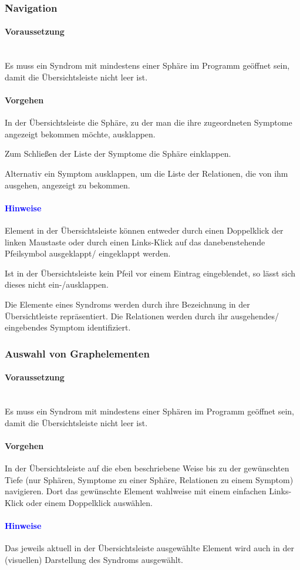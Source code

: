 \documentclass[enabledeprecatedfontcommands,fontsize=11pt,paper=a4,twoside]{scrartcl}
\newcounter{one}
\newcounter{two}[one]
\newcommand*{\hint}{\paragraph{\textcolor{blue}{Hinweise}}}
\newcommand*{\condition}{\paragraph{Voraussetzung}$\;$ \vspace{0.2cm}\\}
\newcommand*{\action}{\paragraph{Vorgehen}}
\let\tempone\itemize
\let\temptwo\enditemize
\renewenvironment{itemize}{\tempone\addtolength{\itemsep}{-10.0pt}}{\temptwo}
\let\origenumerate\enumerate
\let\origendenumerate\endenumerate
\renewenvironment{enumerate}{\origenumerate \addtolength{\itemsep}{-10.0pt}}{\origendenumerate}
\begin{document}
\subsubsection{Navigation}		
	\condition
	Es muss ein Syndrom mit mindestens einer Sphäre im Programm geöffnet sein, damit die Übersichtsleiste nicht leer ist. 
	\action
	\begin{enumerate}
		\item In der Übersichtsleiste die Sphäre, zu der man die ihre zugeordneten Symptome angezeigt bekommen möchte, ausklappen. 
		\item Zum Schließen der Liste der Symptome die Sphäre einklappen. 
		\item Alternativ ein Symptom ausklappen, um die Liste der Relationen, die von ihm ausgehen, angezeigt zu bekommen. 
	\end{enumerate}
	\hint
	\begin{itemize}
		\item Element in der Übersichtsleiste können entweder durch einen Doppelklick der linken Maustaste oder durch einen Links-Klick auf das danebenstehende Pfeilsymbol ausgeklappt/ eingeklappt werden. 
		\item Ist in der Übersichtsleiste kein Pfeil vor einem Eintrag eingeblendet, so lässt sich dieses nicht ein-/ausklappen.
		\item Die Elemente eines Syndroms werden durch ihre Bezeichnung in der Übersichtleiste repräsentiert. Die Relationen werden durch ihr ausgehendes/ eingebendes Symptom identifiziert.\\
	\end{itemize}
		 
\subsubsection{Auswahl von Graphelementen}		
	\condition
	Es muss ein Syndrom mit mindestens einer Sphären im Programm geöffnet sein, damit die Übersichtsleiste nicht leer ist. 
	\action
	\begin{enumerate}
		\item In der Übersichtsleiste auf die eben beschriebene Weise bis zu der gewünschten Tiefe (nur Sphären, Symptome zu einer Sphäre, Relationen zu einem Symptom) navigieren. Dort das gewünschte Element wahlweise mit einem einfachen Links-Klick oder einem Doppelklick auswählen.
		\end{enumerate}
	\hint
	\begin{itemize}
		\item Das jeweils aktuell in der Übersichtsleiste ausgewählte Element wird auch in der (visuellen) Darstellung des Syndroms ausgewählt.\\
	\end{itemize}
		
\end{document}
